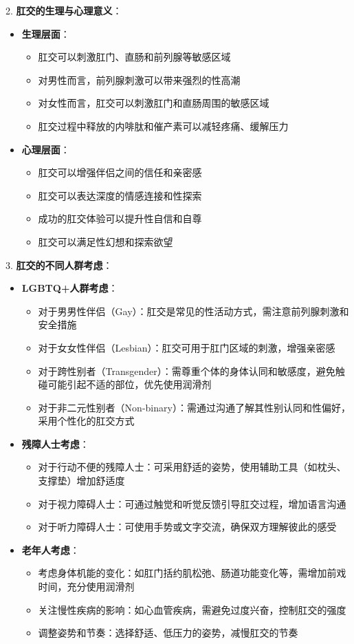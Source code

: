 \documentclass[12pt,UTF8]{ctexbook}
\begin{document}
2. \textbf{肛交的生理与心理意义}：
\begin{itemize}
	\item \textbf{生理层面}：
	\begin{itemize}
		\item 肛交可以刺激肛门、直肠和前列腺等敏感区域
		\item 对男性而言，前列腺刺激可以带来强烈的性高潮
		\item 对女性而言，肛交可以刺激肛门和直肠周围的敏感区域
		\item 肛交过程中释放的内啡肽和催产素可以减轻疼痛、缓解压力
	\end{itemize}
	\item \textbf{心理层面}：
	\begin{itemize}
		\item 肛交可以增强伴侣之间的信任和亲密感
		\item 肛交可以表达深度的情感连接和性探索
		\item 成功的肛交体验可以提升性自信和自尊
		\item 肛交可以满足性幻想和探索欲望
	\end{itemize}
\end{itemize}

3. \textbf{肛交的不同人群考虑}：
\begin{itemize}
	\item \textbf{LGBTQ+人群考虑}：
	\begin{itemize}
		\item 对于男男性伴侣（Gay）：肛交是常见的性活动方式，需注意前列腺刺激和安全措施
		\item 对于女女性伴侣（Lesbian）：肛交可用于肛门区域的刺激，增强亲密感
		\item 对于跨性别者（Transgender）：需尊重个体的身体认同和敏感度，避免触碰可能引起不适的部位，优先使用润滑剂
		\item 对于非二元性别者（Non-binary）：需通过沟通了解其性别认同和性偏好，采用个性化的肛交方式
	\end{itemize}
	\item \textbf{残障人士考虑}：
	\begin{itemize}
		\item 对于行动不便的残障人士：可采用舒适的姿势，使用辅助工具（如枕头、支撑垫）增加舒适度
		\item 对于视力障碍人士：可通过触觉和听觉反馈引导肛交过程，增加语言沟通
		\item 对于听力障碍人士：可使用手势或文字交流，确保双方理解彼此的感受
	\end{itemize}
	\item \textbf{老年人考虑}：
	\begin{itemize}
		\item 考虑身体机能的变化：如肛门括约肌松弛、肠道功能变化等，需增加前戏时间，充分使用润滑剂
		\item 关注慢性疾病的影响：如心血管疾病，需避免过度兴奋，控制肛交的强度
		\item 调整姿势和节奏：选择舒适、低压力的姿势，减慢肛交的节奏
	\end{itemize}
\end{itemize}
\end{document}
